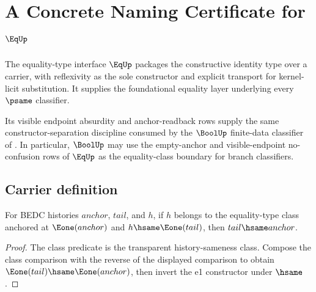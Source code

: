 \chapter{A Concrete Naming Certificate for $\EqUp$}
\label{ch:concrete-instances-eqtype-namecert}

The equality-type interface $\EqUp$ packages the constructive identity type over a carrier, with reflexivity as the sole constructor and explicit transport for kernel-licit substitution. It supplies the foundational equality layer underlying every $\psame$ classifier.

Its visible endpoint absurdity and anchor-readback rows supply the same constructor-separation discipline consumed by the $\BoolUp$ finite-data classifier of . In particular, $\BoolUp$ may use the empty-anchor and visible-endpoint no-confusion rows of $\EqUp$ as the equality-class boundary for branch classifiers.

\section{Carrier definition}
\label{sec:eqtype-carrier}

\begin{theorem}
\label{thm:eqtype-class-carrier-e1-anchor-tail-readback}
For BEDC histories $anchor$, $tail$, and $h$, if $h$ belongs to the equality-type
class anchored at $\Eone(anchor)$ and $h\hsame\Eone(tail)$, then
$tail\hsame anchor$.
\end{theorem}
\begin{proof}
The class predicate is the transparent history-sameness class. Compose the class
comparison with the reverse of the displayed comparison to obtain
$\Eone(tail)\hsame\Eone(anchor)$, then invert the e1 constructor under $\hsame$.
\end{proof}

